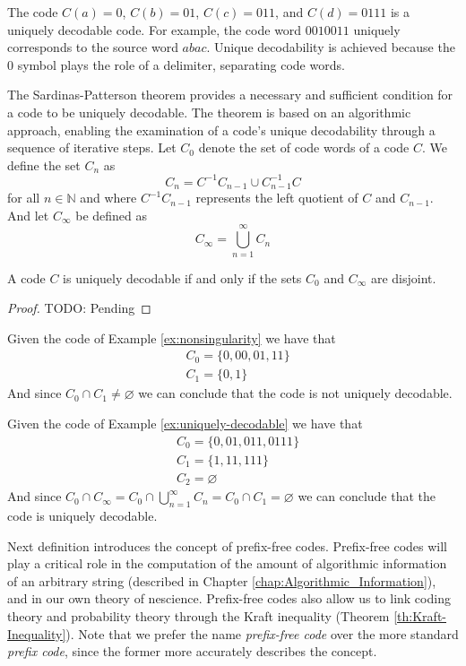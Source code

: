 \begin{example}
\label{ex:uniquely-decodable}
The code $C(a)=0$, $C(b)=01$, $C(c)=011$, and $C(d)=0111$ is a uniquely decodable code. For example, the code word $0010011$ uniquely corresponds to the source word $abac$. Unique decodability is achieved because the $0$ symbol plays the role of a delimiter, separating code words.
\end{example}

The Sardinas-Patterson theorem provides a necessary and sufficient condition for a code to be uniquely decodable. The theorem is based on an algorithmic approach, enabling the examination of a code's unique decodability through a sequence of iterative steps. Let $C_0$ denote the set of code words of a code $C$. We define the set $C_n$ as
\[
C_n = C^{-1} C_{n-1} \cup C^{-1}_{n-1} C
\]
for all $n \in \mathbb{N}$ and where $C^{-1} C_{n-1}$ represents the left quotient of $C$ and $C_{n-1}$. And let $C_\infty$ be defined as
\[
C_\infty = \bigcup^\infty_{n=1} C_n
\]

\begin{proposition}
A code $C$ is uniquely decodable if and only if the sets $C_0$ and $C_\infty$ are disjoint.
\end{proposition}
\begin{proof}
{\color{red} TODO: Pending}
\end{proof}

\begin{example}
Given the code of Example \ref{ex:nonsingularity} we have that
\begin{align*}
 & C_0 = \{0, 00, 01, 11\} \\
 & C_1 = \{0, 1\}
\end{align*}
And since $C_0 \cap C_1 \neq \varnothing$ we can conclude that the code is not uniquely decodable.

Given the code of Example \ref{ex:uniquely-decodable} we have that
\begin{align*}
 & C_0 = \{0, 01, 011, 0111\} \\
 & C_1 = \{1, 11, 111\} \\
 & C_2 = \varnothing
\end{align*}
And since $C_0 \cap C_\infty = C_0 \cap \bigcup^\infty_{n=1} C_n = C_0 \cap C_1 = \varnothing$ we can conclude that the code is uniquely decodable.
\end{example}

Next definition introduces the concept of prefix-free codes. Prefix-free codes will play a critical role in the computation of the amount of algorithmic information of an arbitrary string (described in Chapter \ref{chap:Algorithmic_Information}), and in our own theory of nescience. Prefix-free codes also allow us to link coding theory and probability theory through the Kraft inequality (Theorem \ref{th:Kraft-Inequality}). Note that we prefer the name \emph{prefix-free code} over the more standard \emph{prefix code}, since the former more accurately describes the concept.

